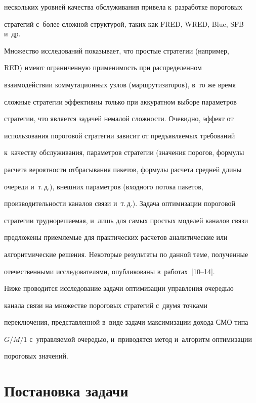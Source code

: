 нескольких уровней качества обслуживания привела к~разработке пороговых 


стратегий с~более сложной структурой, таких как FRED, WRED, Blue, SFB и~др. 


  


  Множество исследований показывает, что простые стратегии (например, 


RED) имеют ограниченную применимость при распределенном 


взаимодействии коммутационных узлов (маршрутизаторов), в~то же время 


сложные стратегии эффективны только при аккуратном выборе параметров 


стратегии, что является задачей немалой сложности. Очевидно, эффект от 


использования пороговой стратегии зависит от предъявляемых требований 


к~качеству обслуживания, параметров стратегии (значения порогов, формулы 


расчета вероятности отбрасывания пакетов, формулы расчета средней длины 


очереди и~т.\,д.), внешних параметров (входного потока пакетов, 


производительности каналов связи и~т.\,д.). Задача оптимизации пороговой 


стратегии труднорешаемая, и~лишь для самых простых моделей каналов связи 


предложены приемлемые для практических расчетов аналитические или 


алгоритмические решения. Некоторые результаты по данной теме, полученные 


отечественными исследователями, опубликованы в~работах~[10--14].


  


  Ниже проводится исследование задачи оптимизации управления очередью 


канала связи на множестве пороговых стратегий с~двумя точками 


переключения, представленной в~виде задачи максимизации дохода СМО типа 


$G/M/1$ с~управляемой очередью, и~приводятся метод и~алгоритм оптимизации 


пороговых значений.


  


  \section{Постановка задачи}



